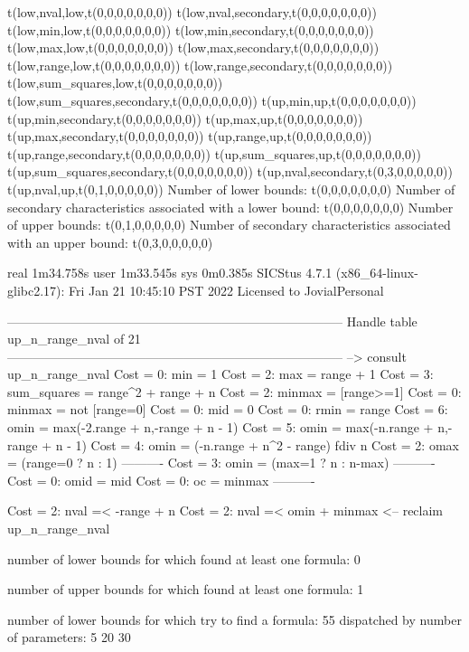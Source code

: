 t(low,nval,low,t(0,0,0,0,0,0,0))
t(low,nval,secondary,t(0,0,0,0,0,0,0))
t(low,min,low,t(0,0,0,0,0,0,0))
t(low,min,secondary,t(0,0,0,0,0,0,0))
t(low,max,low,t(0,0,0,0,0,0,0))
t(low,max,secondary,t(0,0,0,0,0,0,0))
t(low,range,low,t(0,0,0,0,0,0,0))
t(low,range,secondary,t(0,0,0,0,0,0,0))
t(low,sum_squares,low,t(0,0,0,0,0,0,0))
t(low,sum_squares,secondary,t(0,0,0,0,0,0,0))
t(up,min,up,t(0,0,0,0,0,0,0))
t(up,min,secondary,t(0,0,0,0,0,0,0))
t(up,max,up,t(0,0,0,0,0,0,0))
t(up,max,secondary,t(0,0,0,0,0,0,0))
t(up,range,up,t(0,0,0,0,0,0,0))
t(up,range,secondary,t(0,0,0,0,0,0,0))
t(up,sum_squares,up,t(0,0,0,0,0,0,0))
t(up,sum_squares,secondary,t(0,0,0,0,0,0,0))
t(up,nval,secondary,t(0,3,0,0,0,0,0))
t(up,nval,up,t(0,1,0,0,0,0,0))
Number of lower bounds:                                             t(0,0,0,0,0,0,0)
Number of secondary characteristics associated with a lower bound:  t(0,0,0,0,0,0,0)
Number of upper bounds:                                             t(0,1,0,0,0,0,0)
Number of secondary characteristics associated with an upper bound: t(0,3,0,0,0,0,0)

real	1m34.758s
user	1m33.545s
sys	0m0.385s
SICStus 4.7.1 (x86_64-linux-glibc2.17): Fri Jan 21 10:45:10 PST 2022
Licensed to JovialPersonal


--------------------------------------------------------------------------------
Handle table up_n_range_nval of 21
--------------------------------------------------------------------------------
--> consult up_n_range_nval
Cost =  0:  min         = 1
Cost =  2:  max         = range + 1
Cost =  3:  sum_squares = range^2 + range + n
Cost =  2:  minmax      = [range>=1]
Cost =  0:  minmax      = not [range=0]
Cost =  0:  mid         = 0
Cost =  0:  rmin        = range
Cost =  6:  omin        = max(-2.range + n,-range + n - 1)
Cost =  5:  omin        = max(-n.range + n,-range + n - 1)
Cost =  4:  omin        = (-n.range + n^2 - range) fdiv n
Cost =  2:  omax        = (range=0 ? n : 1)
----------
Cost =  3:  omin        = (max=1 ? n : n-max)
----------
Cost =  0:  omid        = mid
Cost =  0:  oc          = minmax
----------

Cost =  2:  nval =< -range + n
Cost =  2:  nval =< omin + minmax
<-- reclaim up_n_range_nval

number of lower bounds for which found at least one formula: 0

number of upper bounds for which found at least one formula: 1

number of lower bounds for which try to find a formula: 55
dispatched by number of parameters: 5  20  30

